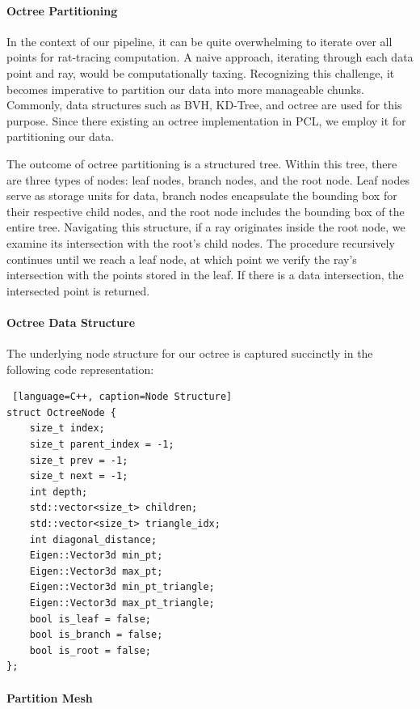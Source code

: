 \documentclass[11pt, a4paper,oneside,chapterprefix=false]{scrbook}
\begin{document}
\paragraph{Octree Partitioning}

In the context of our pipeline, it can be quite overwhelming to iterate over all points for rat-tracing computation. A naive approach, iterating through each data point and ray, would be computationally taxing. Recognizing this challenge, it becomes imperative to partition our data into more manageable chunks. Commonly, data structures such as BVH, KD-Tree, and octree are used for this purpose. Since there existing an octree implementation in PCL, we employ it for partitioning our data.

\vspace{10pt}

The outcome of octree partitioning is a structured tree. Within this tree, there are three types of nodes: leaf nodes, branch nodes, and the root node. Leaf nodes serve as storage units for data, branch nodes encapsulate the bounding box for their respective child nodes, and the root node includes the bounding box of the entire tree. Navigating this structure, if a ray originates inside the root node, we examine its intersection with the root's child nodes. The procedure recursively continues until we reach a leaf node, at which point we verify the ray's intersection with the points stored in the leaf. If there is a data intersection, the intersected point is returned. 

\paragraph{Octree Data Structure}

The underlying node structure for our octree is captured succinctly in the following code representation:

\begin{lstlisting} [language=C++, caption=Node Structure]
struct OctreeNode {
    size_t index;
    size_t parent_index = -1;
    size_t prev = -1;
    size_t next = -1;
    int depth;
    std::vector<size_t> children;
    std::vector<size_t> triangle_idx;
    int diagonal_distance;
    Eigen::Vector3d min_pt;
    Eigen::Vector3d max_pt;
    Eigen::Vector3d min_pt_triangle;
    Eigen::Vector3d max_pt_triangle;
    bool is_leaf = false;
    bool is_branch = false;
    bool is_root = false;
};
\end{lstlisting}

\paragraph{Partition Mesh} \label{par:mesh octree}
\end{document}
